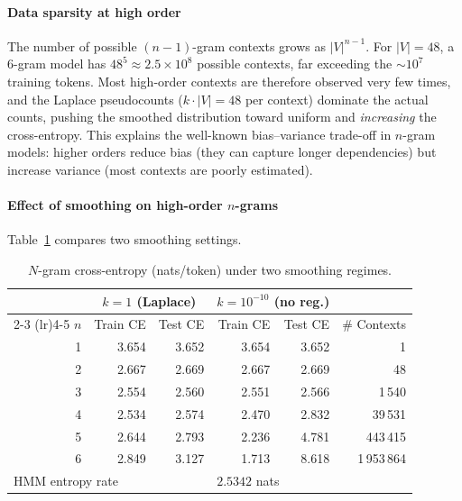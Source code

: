 \documentclass[11pt]{article}
\begin{document}
\paragraph{Data sparsity at high order}
The number of possible $(n{-}1)$-gram contexts grows as $|V|^{n-1}$.
For $|V| = 48$, a 6-gram model has $48^5 \approx 2.5 \times 10^8$
possible contexts, far exceeding the ${\sim}10^7$ training tokens.
Most high-order contexts are therefore observed very few times, and the
Laplace pseudocounts ($k \cdot |V| = 48$ per context) dominate the
actual counts, pushing the smoothed distribution toward uniform and
\emph{increasing} the cross-entropy.  This explains the well-known
bias--variance trade-off in $n$-gram models: higher orders reduce bias
(they can capture longer dependencies) but increase variance (most
contexts are poorly estimated).

\paragraph{Effect of smoothing on high-order $n$-grams}
Table~\ref{tab:ngram-smoothing} compares two smoothing settings.

\begin{table}[htbp]
  \centering
  \begin{tabular}{r r r r r r}
    \toprule
    & \multicolumn{2}{c}{$k = 1$ (Laplace)} & \multicolumn{2}{c}{$k = 10^{-10}$ (no reg.)} & \\
    \cmidrule(lr){2-3} \cmidrule(lr){4-5}
    $n$ & Train CE & Test CE & Train CE & Test CE & \# Contexts \\
    \midrule
    1 & 3.654 & 3.652 & 3.654 & 3.652 &           1 \\
    2 & 2.667 & 2.669 & 2.667 & 2.669 &          48 \\
    3 & 2.554 & 2.560 & 2.551 & 2.566 &       1\,540 \\
    4 & 2.534 & 2.574 & 2.470 & 2.832 &      39\,531 \\
    5 & 2.644 & 2.793 & 2.236 & 4.781 &     443\,415 \\
    6 & 2.849 & 3.127 & 1.713 & 8.618 &   1\,953\,864 \\
    \midrule
    \multicolumn{3}{l}{HMM entropy rate} & \multicolumn{3}{l}{$2.5342$ nats} \\
    \bottomrule
  \end{tabular}
  \caption{$N$-gram cross-entropy (nats/token) under two smoothing
           regimes.}
  \label{tab:ngram-smoothing}
\end{table}
\end{document}
